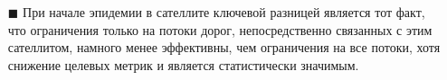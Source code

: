 \documentclass[a4paper,12pt]{article} %
\begin{document}
\begin{itemize}
\begin{itemize}
\item[$\blacksquare$] При начале эпидемии в сателлите ключевой разницей является тот факт, что ограничения только на потоки дорог, непосредственно связанных с этим сателлитом, намного менее эффективны, чем ограничения на все потоки, хотя снижение целевых метрик и является статистически значимым.
\end{itemize}
\end{itemize}

\newpage
\printbibliography
\end{document}
